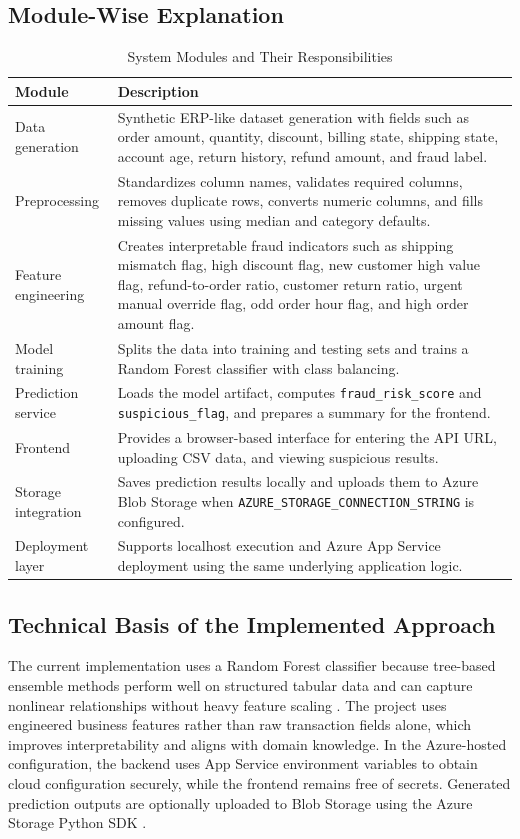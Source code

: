 \documentclass[a4paper,12pt]{article}
\begin{document}
\subsection{Module-Wise Explanation}
\begin{table}[H]
\centering
\caption{System Modules and Their Responsibilities}
\begin{tabular}{p{3cm} p{10.2cm}}
\toprule
\textbf{Module} & \textbf{Description} \\
\midrule
Data generation & Synthetic ERP-like dataset generation with fields such as order amount, quantity, discount, billing state, shipping state, account age, return history, refund amount, and fraud label. \\
Preprocessing & Standardizes column names, validates required columns, removes duplicate rows, converts numeric columns, and fills missing values using median and category defaults. \\
Feature engineering & Creates interpretable fraud indicators such as shipping mismatch flag, high discount flag, new customer high value flag, refund-to-order ratio, customer return ratio, urgent manual override flag, odd order hour flag, and high order amount flag. \\
Model training & Splits the data into training and testing sets and trains a Random Forest classifier with class balancing. \\
Prediction service & Loads the model artifact, computes \texttt{fraud\_risk\_score} and \texttt{suspicious\_flag}, and prepares a summary for the frontend. \\
Frontend & Provides a browser-based interface for entering the API URL, uploading CSV data, and viewing suspicious results. \\
Storage integration & Saves prediction results locally and uploads them to Azure Blob Storage when \texttt{AZURE\_STORAGE\_CONNECTION\_STRING} is configured. \\
Deployment layer & Supports localhost execution and Azure App Service deployment using the same underlying application logic. \\
\bottomrule
\end{tabular}
\end{table}

\subsection{Technical Basis of the Implemented Approach}
The current implementation uses a Random Forest classifier because tree-based ensemble methods perform well on structured tabular data and can capture nonlinear relationships without heavy feature scaling \cite{afriyie2023supervised,sulaiman2022review}. The project uses engineered business features rather than raw transaction fields alone, which improves interpretability and aligns with domain knowledge. In the Azure-hosted configuration, the backend uses App Service environment variables to obtain cloud configuration securely, while the frontend remains free of secrets. Generated prediction outputs are optionally uploaded to Blob Storage using the Azure Storage Python SDK \cite{azureappservice,azureblobpython}.
\end{document}
